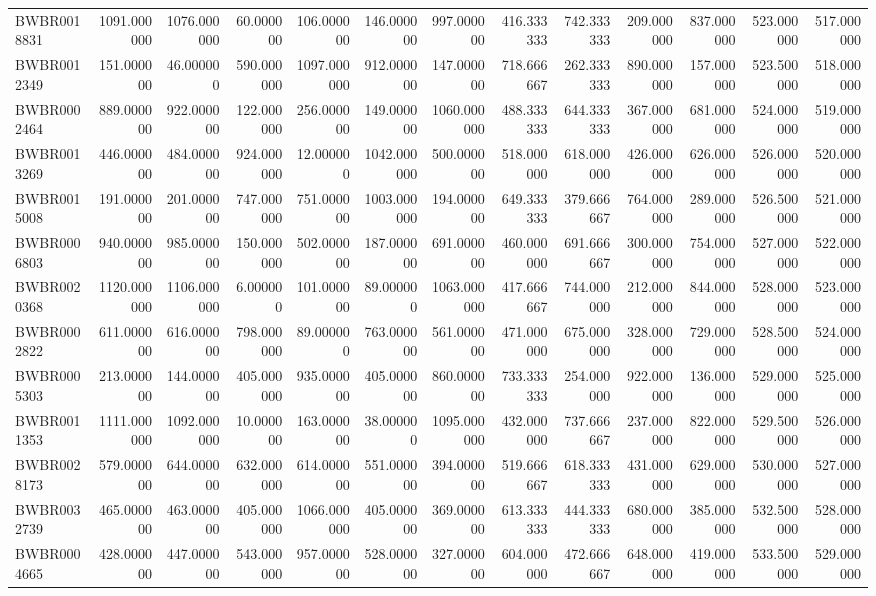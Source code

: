 \begin{longtable}{lrrrrrrrrrrrr}
BWBR0018831 & 1091.000000 & 1076.000000 & 60.000000 & 106.000000 & 146.000000 & 997.000000 & 416.333333 & 742.333333 & 209.000000 & 837.000000 & 523.000000 & 517.000000 \\
BWBR0012349 & 151.000000 & 46.000000 & 590.000000 & 1097.000000 & 912.000000 & 147.000000 & 718.666667 & 262.333333 & 890.000000 & 157.000000 & 523.500000 & 518.000000 \\
BWBR0002464 & 889.000000 & 922.000000 & 122.000000 & 256.000000 & 149.000000 & 1060.000000 & 488.333333 & 644.333333 & 367.000000 & 681.000000 & 524.000000 & 519.000000 \\
BWBR0013269 & 446.000000 & 484.000000 & 924.000000 & 12.000000 & 1042.000000 & 500.000000 & 518.000000 & 618.000000 & 426.000000 & 626.000000 & 526.000000 & 520.000000 \\
BWBR0015008 & 191.000000 & 201.000000 & 747.000000 & 751.000000 & 1003.000000 & 194.000000 & 649.333333 & 379.666667 & 764.000000 & 289.000000 & 526.500000 & 521.000000 \\
BWBR0006803 & 940.000000 & 985.000000 & 150.000000 & 502.000000 & 187.000000 & 691.000000 & 460.000000 & 691.666667 & 300.000000 & 754.000000 & 527.000000 & 522.000000 \\
BWBR0020368 & 1120.000000 & 1106.000000 & 6.000000 & 101.000000 & 89.000000 & 1063.000000 & 417.666667 & 744.000000 & 212.000000 & 844.000000 & 528.000000 & 523.000000 \\
BWBR0002822 & 611.000000 & 616.000000 & 798.000000 & 89.000000 & 763.000000 & 561.000000 & 471.000000 & 675.000000 & 328.000000 & 729.000000 & 528.500000 & 524.000000 \\
BWBR0005303 & 213.000000 & 144.000000 & 405.000000 & 935.000000 & 405.000000 & 860.000000 & 733.333333 & 254.000000 & 922.000000 & 136.000000 & 529.000000 & 525.000000 \\
BWBR0011353 & 1111.000000 & 1092.000000 & 10.000000 & 163.000000 & 38.000000 & 1095.000000 & 432.000000 & 737.666667 & 237.000000 & 822.000000 & 529.500000 & 526.000000 \\
BWBR0028173 & 579.000000 & 644.000000 & 632.000000 & 614.000000 & 551.000000 & 394.000000 & 519.666667 & 618.333333 & 431.000000 & 629.000000 & 530.000000 & 527.000000 \\
BWBR0032739 & 465.000000 & 463.000000 & 405.000000 & 1066.000000 & 405.000000 & 369.000000 & 613.333333 & 444.333333 & 680.000000 & 385.000000 & 532.500000 & 528.000000 \\
BWBR0004665 & 428.000000 & 447.000000 & 543.000000 & 957.000000 & 528.000000 & 327.000000 & 604.000000 & 472.666667 & 648.000000 & 419.000000 & 533.500000 & 529.000000 \\

\end{longtable}
